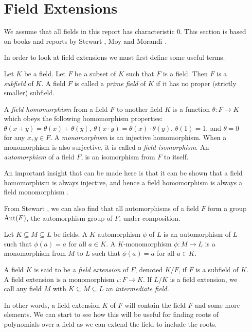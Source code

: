 \section{Field Extensions}
We assume that all fields in this report has characteristic $0$.  This section is based on books and reports by Stewart \cite{Stewart}, Moy \cite{Moy} and Morandi \cite{ morandi_field_1996}. 

In order to look at field extensions we must first define some useful terms. 
\begin{definition}
Let $K$ be a field. Let \(F\) be a subset of \(K\) such that $F$ is a field. Then $F$ is a \textit{subfield}
 of $K$.
A field \(F\) is called a \textit{prime field} of \(K\) if it has no proper (strictly smaller) subfield.
\end{definition}
\begin{definition}
	A \textit{field homomorphism} from a field $F$ to another field $K$ is a function $\theta: F \to K$ which obeys the following homomorphism properties: $\theta(x + y) = \theta(x) + \theta(y)$, $\theta(x\cdot y) = \theta(x) \cdot \theta(y)$, $\theta(1) = 1$, and $\theta = 0$ for any $x, y \in F$. 
    A \textit{monomorphism} is an injective homomorphism. 
	When a monomorphism is also surjective, it is called a \textit{field isomorphism}. An \textit{automorphism} of a field $F$, is an isomorphism from $F$ to itself.
\end{definition}

An important insight that can be made here is that it can be shown that a field homomorphism is always injective, and hence a field homomorphism is always a field monomorphism \cite{morandi_field_1996}.

From Stewart \cite{Stewart}, we can also find that all automorphisms of a field $F$ form a group $\operatorname{Aut}(F)$, the automorphism group of $F$, under composition.

\begin{definition} \label{def:automorphism}
	Let $K \subseteq M \subseteq L$ be fields. A $K$-automorphism $\phi$ of $L$ is an automorphism of $L$ such that $\phi(a) = a$ for all $a \in K$. 
	A $K$-monomorphism $\phi : M \to L$ is a monomorphism from $M$ to $L$ such that $\phi(a) = a$ for all $a \in K$. 
\end{definition}

\begin{definition}
A field \(K\) is said to be a \textit{field extension} of \(F\), denoted \(K / F\), if \(F\) is a subfield of \(K\).  A field extension is a monomorphism \(\iota: F \to K\). If $L/K$ is a field extension, we call any field $M$ with $K \subseteq M \subseteq L$ an \textit{intermediate field.}
\end{definition}
In other words, a field extension \(K\) of \(F\) will contain the field \(F\) and some more elements. We can start to see how this will be useful for finding roots of polynomials over a field as we can extend the field to include the roots.

